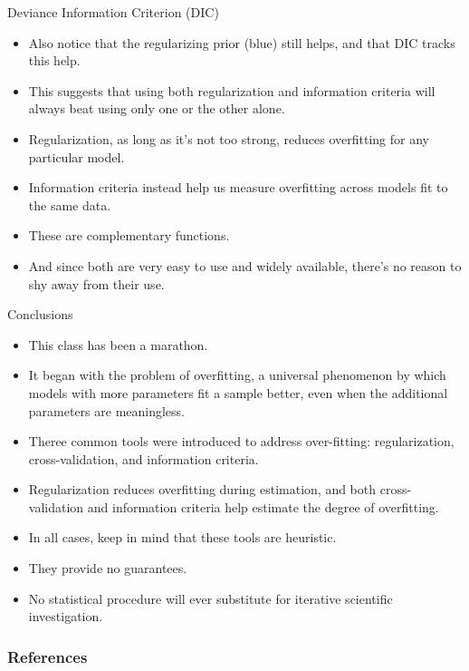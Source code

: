 \documentclass[handout]{beamer}
\begin{document}
\begin{frame}{Deviance Information Criterion (DIC)}
\scriptsize{


\begin{itemize}
 


\item Also notice that the regularizing prior (blue) still helps, and that DIC tracks this help.
\item This suggests that using both regularization and information criteria will always beat using only one or the other alone. 
\item Regularization, as long as it's not too strong, reduces  overfitting for any particular model. \item Information criteria instead help us measure overfitting across models fit to the same data. 
\item These are complementary functions. 
\item And since both are very easy to use and widely available, there's no reason to shy away from their use.


\end{itemize}


} 
\end{frame}


\begin{frame}{Conclusions}
\scriptsize{

\begin{itemize}
\item This class has been a marathon. 
\item It began with the problem of overfitting, a universal phenomenon by which models with more parameters fit a sample better, even when the additional parameters are meaningless.
\item Theree common tools were introduced to address over-fitting: regularization, cross-validation, and information criteria.
\item Regularization reduces overfitting during estimation, and both cross-validation and information criteria help estimate the degree of overfitting. 
\item In all cases, keep in mind that these tools are heuristic. 
\item They provide no guarantees. 
\item No statistical procedure will ever substitute for iterative scientific investigation.
\end{itemize}


} 
\end{frame}


\begin{frame}[allowframebreaks]\scriptsize
\frametitle{References}


%
\end{frame}  









\end{document}
